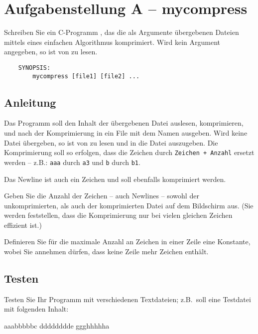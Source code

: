 




\section*{Aufgabenstellung A -- mycompress}
      Schreiben Sie ein C-Programm ,
      das die als Argumente übergebenen Dateien mittels
      eines einfachen Algorithmus komprimiert.
      Wird kein Argument angegeben, so ist von
       zu lesen.
\begin{verbatim}
    SYNOPSIS:
        mycompress [file1] [file2] ...
\end{verbatim}

\subsection*{Anleitung}
      Das Programm soll den Inhalt der übergebenen Datei
      auslesen, komprimieren, und nach der Komprimierung in ein
      File mit dem Namen 
      ausgeben. Wird keine Datei übergeben, so ist von  zu
      lesen und in die Datei  auszugeben. Die
      Komprimierung soll so erfolgen, dass die Zeichen durch
      \verb|Zeichen + Anzahl| ersetzt werden -- z.B.: \verb|aaa| durch \verb|a3|
      und \verb|b| durch \verb|b1|.

      Das Newline ist auch ein Zeichen und soll ebenfalls komprimiert werden.

      Geben Sie die Anzahl der Zeichen -- auch Newlines --
      sowohl der unkomprimierten, als auch der komprimierten Datei
      auf dem Bildschirm aus. (Sie werden feststellen, dass die
      Komprimierung nur bei vielen gleichen Zeichen effizient ist.)

      Definieren Sie für die maximale Anzahl an Zeichen in einer
      Zeile eine Konstante, wobei Sie annehmen dürfen, dass keine
      Zeile mehr Zeichen enthält.

\subsection*{Testen}
      Testen Sie Ihr Programm mit verschiedenen Textdateien; z.B.\ soll
      eine Testdatei  mit folgenden Inhalt:

\begin{osuefmtcode}
      aaabbbbbc
      dddddddde
      ggghhhhha
\end{osuefmtcode}

